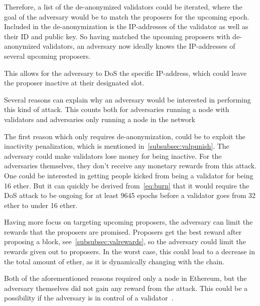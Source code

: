 Therefore, a list of the de-anonymized validators could be iterated, where the goal of the adversary would be to match the proposers for the upcoming epoch.
Included in the de-anonymization is the IP-addresses of the validator as well as their ID and public key.
So having matched the upcoming proposers with de-anonymized validators, an adversary now ideally knows the IP-addresses of several upcoming proposers.

This allows for the adversary to DoS the specific IP-address, which could leave the proposer inactive at their designated slot.


Several reasons can explain why an adversary would be interested in performing this kind of attack.
This counts both for adversaries running a node with validators and adversaries only running a node in the network


The first reason which only requires de-anonymization, could be to exploit the inactivity penalization, which is mentioned in~\autoref{subsubsec:valpunish}.
The adversary could make validators lose money for being inactive.
For the adversaries themselves, they don't receive any monetary rewards from this attack. 
One could be interested in getting people kicked from being a validator for being 16 ether.
But it can quickly be derived from~\autoref{eq:burn} that it would require the DoS attack to be ongoing for at least 9645 epochs before a validator goes from 32 ether to under 16 ether.


Having more focus on targeting upcoming proposers, the adversary can limit the rewards that the proposers are promised.
Proposers get the best reward after proposing a block, see~\autoref{subsubsec:valrewards}, so the adversary could limit the rewards given out to proposers.
In the worst case, this could lead to a decrease in the total amount of ether, as it is dynamically changing with the chain.


Both of the aforementioned reasons required only a node in Ethereum, but the adversary themselves did not gain any reward from the attack.
This could be a possibility if the adversary is in control of a validator~.